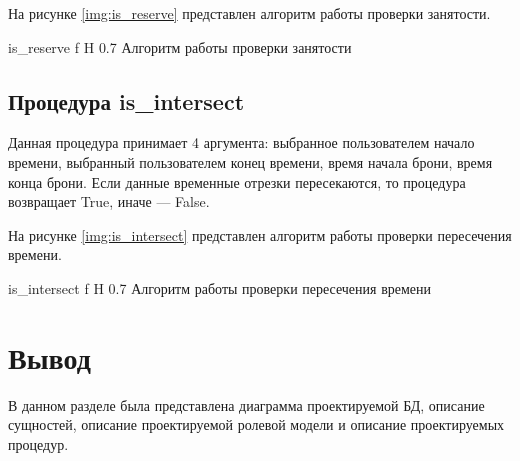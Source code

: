 На рисунке \ref{img:is_reserve} представлен алгоритм работы проверки занятости.

{is_reserve} %
{f} %
{H} %
{0.7\textwidth} %
{Алгоритм работы проверки занятости} %

\subsection{Процедура is\_intersect}
Данная процедура принимает 4 аргумента: выбранное пользователем начало времени, выбранный пользователем конец времени, время начала брони, время конца брони.
Если данные временные отрезки пересекаются, то процедура возвращает True, иначе --- False.

На рисунке \ref{img:is_intersect} представлен алгоритм работы проверки пересечения времени. 

{is_intersect} %
{f} %
{H} %
{0.7\textwidth} %
{Алгоритм работы проверки пересечения времени} %


\section*{Вывод}

В данном разделе была представлена диаграмма проектируемой БД, описание сущностей, описание проектируемой ролевой модели и описание проектируемых процедур.

